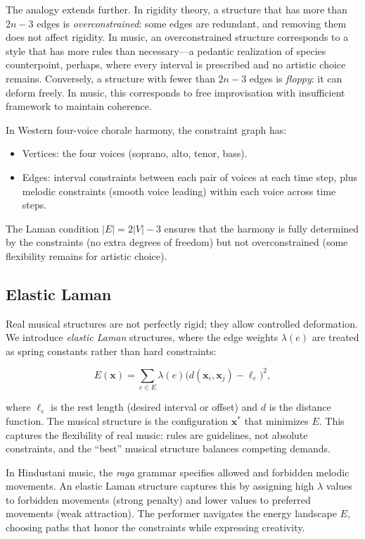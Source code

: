 \documentclass[cmj]{article}
\begin{document}
The analogy extends further. In rigidity theory, a structure that has more
than $2n - 3$ edges is \emph{overconstrained}: some edges are redundant, and
removing them does not affect rigidity. In music, an overconstrained structure
corresponds to a style that has more rules than necessary---a pedantic
realization of species counterpoint, perhaps, where every interval is
prescribed and no artistic choice remains. Conversely, a structure with fewer
than $2n - 3$ edges is \emph{floppy}: it can deform freely. In music, this
corresponds to free improvisation with insufficient framework to maintain
coherence.

In Western four-voice chorale harmony, the constraint graph has:
\begin{itemize}[nosep]
  \item Vertices: the four voices (soprano, alto, tenor, bass).
  \item Edges: interval constraints between each pair of voices at each time
    step, plus melodic constraints (smooth voice leading) within each voice
    across time steps.
\end{itemize}

The Laman condition $|E| = 2|V| - 3$ ensures that the harmony is fully
determined by the constraints (no extra degrees of freedom) but not
overconstrained (some flexibility remains for artistic choice).

\subsection{Elastic Laman}

Real musical structures are not perfectly rigid; they allow controlled
deformation. We introduce \emph{elastic Laman} structures, where the edge
weights $\lambda(e)$ are treated as spring constants rather than hard
constraints:

\begin{equation}
  E(\mathbf{x}) = \sum_{e \in E} \lambda(e) \bigl(d(\mathbf{x}_i, \mathbf{x}_j)
  - \ell_e\bigr)^2,
  \label{eq:elastic-laman}
\end{equation}

where $\ell_e$ is the rest length (desired interval or offset) and $d$ is the
distance function. The musical structure is the configuration $\mathbf{x}^*$
that minimizes $E$. This captures the flexibility of real music: rules are
guidelines, not absolute constraints, and the ``best'' musical structure
balances competing demands.

In Hindustani music, the \emph{raga} grammar specifies allowed and forbidden
melodic movements. An elastic Laman structure captures this by assigning high
$\lambda$ values to forbidden movements (strong penalty) and lower values to
preferred movements (weak attraction). The performer navigates the energy
landscape $E$, choosing paths that honor the constraints while expressing
creativity.
\end{document}
